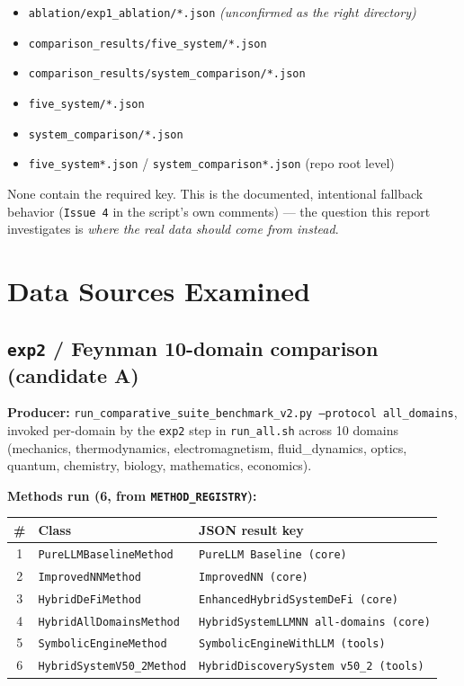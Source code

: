 \documentclass[11pt]{article}
\newcommand{\code}[1]{\texttt{#1}}
\begin{document}
\begin{itemize}
  \item \code{ablation/exp1\_ablation/*.json} \hfill \textit{(unconfirmed as the right directory)}
  \item \code{comparison\_results/five\_system/*.json}
  \item \code{comparison\_results/system\_comparison/*.json}
  \item \code{five\_system/*.json}
  \item \code{system\_comparison/*.json}
  \item \code{five\_system*.json} / \code{system\_comparison*.json} (repo root level)
\end{itemize}

None contain the required key. This is the documented, intentional
fallback behavior (\code{Issue 4} in the script's own comments) --- the
question this report investigates is \emph{where the real data should come
from instead}.

\section{Data Sources Examined}

\subsection{\code{exp2} / Feynman 10-domain comparison (candidate A)}

\textbf{Producer:} \code{run\_comparative\_suite\_benchmark\_v2.py
--protocol all\_domains}, invoked per-domain by the \code{exp2} step in
\code{run\_all.sh} across 10 domains (mechanics, thermodynamics,
electromagnetism, fluid\_dynamics, optics, quantum, chemistry, biology,
mathematics, economics).

\textbf{Methods run (6, from \code{METHOD\_REGISTRY}):}
\begin{center}
\begin{tabular}{cll}
\toprule
\# & Class & JSON result key \\
\midrule
1 & \code{PureLLMBaselineMethod}   & \code{PureLLM Baseline (core)} \\
2 & \code{ImprovedNNMethod}         & \code{ImprovedNN (core)} \\
3 & \code{HybridDeFiMethod}         & \code{EnhancedHybridSystemDeFi (core)} \\
4 & \code{HybridAllDomainsMethod}   & \code{HybridSystemLLMNN all-domains (core)} \\
5 & \code{SymbolicEngineMethod}     & \code{SymbolicEngineWithLLM (tools)} \\
6 & \code{HybridSystemV50\_2Method} & \code{HybridDiscoverySystem v50\_2 (tools)} \\
\bottomrule
\end{tabular}
\end{center}
\end{document}
